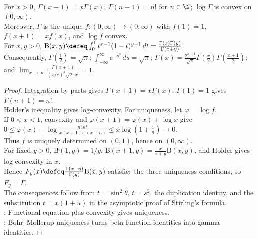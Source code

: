 \begin{theorem} \label{thm:gamma-function-basic-theory} \\
For $x>0$, $\Gamma(x+1)=x\Gamma(x)$; $\Gamma(n+1)=n!$ for $n\in\N$; $\log\Gamma$ is convex on $(0,\infty)$.\\
Moreover, $\Gamma$ is the unique $f:(0,\infty)\to(0,\infty)$ with $f(1)=1$, $f(x+1)=xf(x)$, and $\log f$ convex.\\
For $x,y>0$, $\mathrm{B}(x,y)\defeq\int_0^1t^{x-1}(1-t)^{y-1}\,dt =\frac{\Gamma(x)\Gamma(y)}{\Gamma(x+y)}$.\\
Consequently, $\Gamma\!\left(\frac12\right)=\sqrt{\pi}$; $\int_{-\infty}^{\infty}e^{-s^2}\,ds=\sqrt{\pi}$; $\Gamma(x)=\frac{2^{x-1}}{\sqrt{\pi}}\Gamma\!\left(\frac{x}{2}\right)\Gamma\!\left(\frac{x+1}{2}\right)$; and $\lim_{x\to\infty}\frac{\Gamma(x+1)}{(x/e)^x\sqrt{2\pi x}}=1$.
\begin{proof}
Integration by parts gives $\Gamma(x+1)=x\Gamma(x)$; $\Gamma(1)=1$ gives $\Gamma(n+1)=n!$.\\
Holder's inequality gives log-convexity. For uniqueness, let $\varphi=\log f$.\\
If $0<x<1$, convexity and $\varphi(x+1)=\varphi(x)+\log x$ give $0\leq \varphi(x)-\log\!\frac{n!\,n^x}{x(x+1)\cdots(x+n)} \leq x\log\!\left(1+\frac1n\right)\to0$.\\
Thus $f$ is uniquely determined on $(0,1)$, hence on $(0,\infty)$.\\
For fixed $y>0$, $\mathrm{B}(1,y)=1/y$, $\mathrm{B}(x+1,y)=\frac{x}{x+y}\mathrm{B}(x,y)$, and Holder gives log-convexity in $x$.\\
Hence $F_y(x)\defeq\frac{\Gamma(x+y)}{\Gamma(y)}\mathrm{B}(x,y)$ satisfies the three uniqueness conditions, so $F_y=\Gamma$.\\
The consequences follow from $t=\sin^2\theta$, $t=s^2$, the duplication identity, and the substitution $t=x(1+u)$ in the asymptotic proof of Stirling's formula.\\
: Functional equation plus convexity gives uniqueness.\\
: Bohr--Mollerup uniqueness turns beta-function identities into gamma identities.
\end{proof}
\end{theorem}

